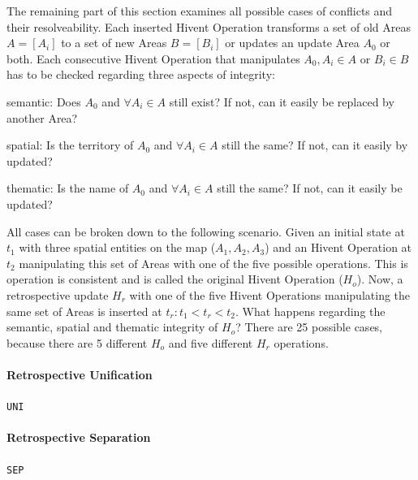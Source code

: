 The remaining part of this section examines all possible cases of conflicts and their resolveability. Each inserted Hivent Operation transforms a set of old Areas $A = [A_i]$ to a set of new Areas $B = [B_i]$ or updates an update Area $A_0$ or both. Each consecutive Hivent Operation that manipulates $A_0, A_i \in A$ or $B_i \in B$ has to be checked regarding three aspects of integrity:

\begin{compactenum}
  \item semantic: Does $A_0$ and $\forall A_i \in A$ still exist? If not, can it easily be replaced by another Area?
  \item spatial: Is the territory of $A_0$ and $\forall A_i \in A$ still the same? If not, can it easily by updated?
  \item thematic: Is the name of $A_0$ and $\forall A_i \in A$ still the same? If not, can it easily be updated?
\end{compactenum}

All cases can be broken down to the following scenario. Given an initial state at $t_1$ with three spatial entities on the map ($A_1, A_2, A_3$) and an Hivent Operation at $t_2$ manipulating this set of Areas with one of the five possible operations. This is operation is consistent and is called the original Hivent Operation ($H_o$). Now, a retrospective update $H_r$ with one of the five Hivent Operations manipulating the same set of Areas is inserted at $t_r: t_1 < t_r < t_2$. What happens regarding the semantic, spatial and thematic integrity of $H_o$? There are 25 possible cases, because there are 5 different $H_o$ and five different $H_r$ operations.


\paragraph{Retrospective Unification} %
\label{par:retrospective_unification}
\texttt{UNI}


\paragraph{Retrospective Separation} %
\label{par:retrospective_separation}
\texttt{SEP}


